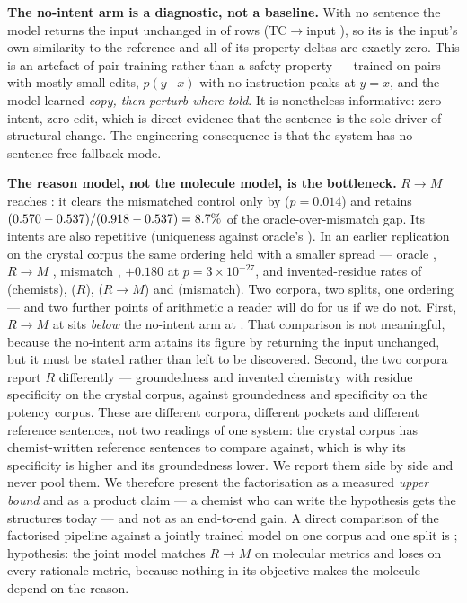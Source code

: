 \textbf{The no-intent arm is a diagnostic, not a baseline.} With no sentence the model returns the
input unchanged in  of rows (TC$\rightarrow$input ), so its  is the
input's own similarity to the reference and all of its property deltas are exactly zero. This is an
artefact of pair training rather than a safety property --- trained on pairs with mostly small
edits, $p(y\mid x)$ with no instruction peaks at $y=x$, and the model learned \emph{copy, then
perturb where told}. It is nonetheless informative: zero intent, zero edit, which is direct evidence
that the sentence is the sole driver of structural change. The engineering consequence is that the
system has no sentence-free fallback mode.

\textbf{The reason model, not the molecule model, is the bottleneck.} $R\!\rightarrow\!M$ reaches
: it clears the mismatched control only by  ($p=0.014$) and retains
$(0.570-0.537)/(0.918-0.537)=8.7\%$ of the oracle-over-mismatch gap. Its intents are also
repetitive (uniqueness  against oracle's ). In an earlier replication on the
crystal corpus the same ordering held with a smaller spread --- oracle , $R\!\rightarrow\!M$
, mismatch , $+0.180$ at $p=3\times10^{-27}$, and invented-residue rates of
 (chemists),  ($R$),  ($R\!\rightarrow\!M$) and  (mismatch).
Two corpora, two splits, one ordering --- and two further points of arithmetic a reader will do
for us if we do not. First, $R\!\rightarrow\!M$ at  sits \emph{below} the no-intent arm at
. That comparison is not meaningful, because the no-intent arm attains its figure by
returning the input unchanged, but it must be stated rather than left to be discovered. Second, the
two corpora report $R$ differently --- groundedness  and invented chemistry  with
residue specificity  on the crystal corpus, against groundedness  and specificity
 on the potency corpus. These are different corpora, different pockets and different
reference sentences, not two readings of one system: the crystal corpus has chemist-written
reference sentences to compare against, which is why its specificity is higher and its groundedness
lower. We report them side by side and never pool them. We therefore present the factorisation as a measured
\emph{upper bound} and as a product claim --- a chemist who can write the hypothesis gets the
structures today --- and not as an end-to-end gain. A direct comparison of the factorised pipeline
against a jointly trained model on one corpus and one split is ;
hypothesis: the joint model matches $R\!\rightarrow\!M$ on molecular metrics and loses on every
rationale metric, because nothing in its objective makes the molecule depend on the reason.

